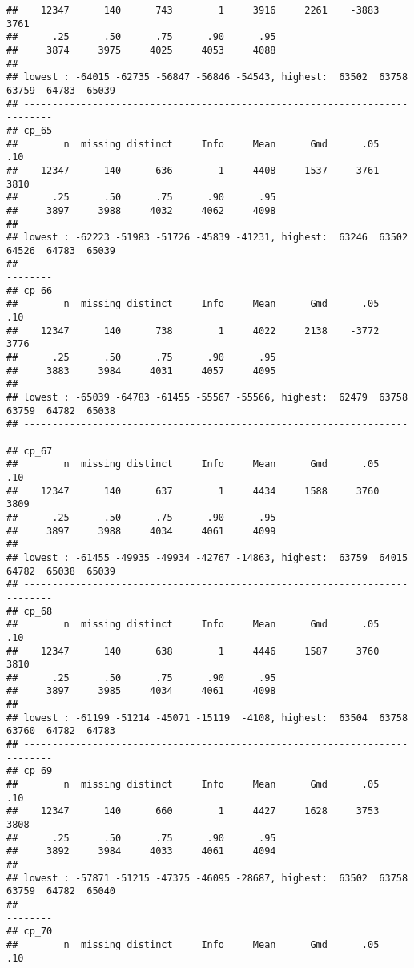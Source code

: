 \documentclass[]{article}
\begin{document}
\begin{verbatim}
##    12347      140      743        1     3916     2261    -3883     3761 
##      .25      .50      .75      .90      .95 
##     3874     3975     4025     4053     4088 
## 
## lowest : -64015 -62735 -56847 -56846 -54543, highest:  63502  63758  63759  64783  65039
## ---------------------------------------------------------------------------
## cp_65 
##        n  missing distinct     Info     Mean      Gmd      .05      .10 
##    12347      140      636        1     4408     1537     3761     3810 
##      .25      .50      .75      .90      .95 
##     3897     3988     4032     4062     4098 
## 
## lowest : -62223 -51983 -51726 -45839 -41231, highest:  63246  63502  64526  64783  65039
## ---------------------------------------------------------------------------
## cp_66 
##        n  missing distinct     Info     Mean      Gmd      .05      .10 
##    12347      140      738        1     4022     2138    -3772     3776 
##      .25      .50      .75      .90      .95 
##     3883     3984     4031     4057     4095 
## 
## lowest : -65039 -64783 -61455 -55567 -55566, highest:  62479  63758  63759  64782  65038
## ---------------------------------------------------------------------------
## cp_67 
##        n  missing distinct     Info     Mean      Gmd      .05      .10 
##    12347      140      637        1     4434     1588     3760     3809 
##      .25      .50      .75      .90      .95 
##     3897     3988     4034     4061     4099 
## 
## lowest : -61455 -49935 -49934 -42767 -14863, highest:  63759  64015  64782  65038  65039
## ---------------------------------------------------------------------------
## cp_68 
##        n  missing distinct     Info     Mean      Gmd      .05      .10 
##    12347      140      638        1     4446     1587     3760     3810 
##      .25      .50      .75      .90      .95 
##     3897     3985     4034     4061     4098 
## 
## lowest : -61199 -51214 -45071 -15119  -4108, highest:  63504  63758  63760  64782  64783
## ---------------------------------------------------------------------------
## cp_69 
##        n  missing distinct     Info     Mean      Gmd      .05      .10 
##    12347      140      660        1     4427     1628     3753     3808 
##      .25      .50      .75      .90      .95 
##     3892     3984     4033     4061     4094 
## 
## lowest : -57871 -51215 -47375 -46095 -28687, highest:  63502  63758  63759  64782  65040
## ---------------------------------------------------------------------------
## cp_70 
##        n  missing distinct     Info     Mean      Gmd      .05      .10 

\end{verbatim}
\end{document}
